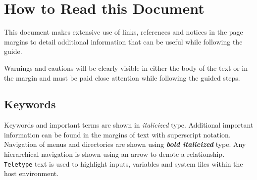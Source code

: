 \section*{How to Read this Document}
This document makes extensive use of links, references and notices in the page margins to detail additional information that can be useful while following the guide. \\


\noindent
Warnings and cautions will be clearly visible in either the body of the text or in the margin and must be paid close attention while following the guided steps. \\




\subsection*{Keywords}
Keywords and important terms are shown in \textit{italicized} type. Additional important information can be found in the margins of text with superscript notation. \\

\noindent
Navigation of menus and directories are shown using \textbf{\textit{bold italicized}} type. Any hierarchical navigation is shown using an arrow to denote a  relationship. \\

\noindent
\texttt{Teletype} text is used to highlight inputs, variables and system files within the host environment.\newpage
